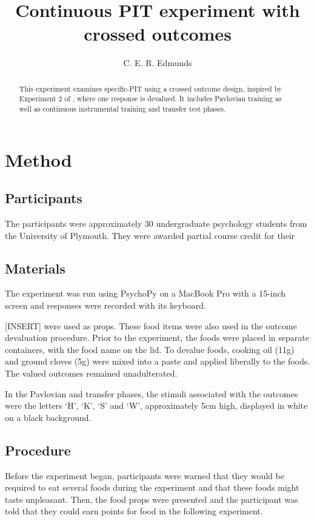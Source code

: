 \documentclass[12pt]{article}
\title{Continuous PIT experiment with crossed outcomes}
\author{C. E. R. Edmunds}
\date{}
\begin{document}
\maketitle
\doublespacing
\newpage
	\begin{abstract}
		This experiment examines specific-PIT using a crossed outcome design,
inspired by Experiment 2 of , where one response is
devalued. It includes Pavlovian training as well as continuous instrumental
training and transfer test phases. 
	\end{abstract}


\section{Method}
\subsection{Participants}

The participants were approximately $30$ undergraduate psychology students from
the University of Plymouth. They were awarded partial course credit for their

\subsection{Materials}
The experiment was run using PsychoPy \cite{Peirce2007, Peirce2009} on a 
MacBook Pro with a 15-inch screen and responses were recorded with
its keyboard.

[INSERT] were used as props. These food items were also used in the outcome
devaluation procedure. Prior to the experiment, the foods were placed in
separate containers, with the food name on the lid. To devalue foods, cooking
oil (11g) and ground cloves (5g) were mixed into a paste and applied liberally
to the foods. The valued outcomes remained unadulterated. 

In the Pavlovian and transfer phases, the stimuli associated with the outcomes
were the letters `H', `K', `S' and `W', approximately 5cm high,
displayed in white on a black background.

\subsection{Procedure}
Before the experiment began, participants were warned that they would be
required to eat several foods during the experiment and that these foods might
taste unpleasant. Then, the food props were presented and the participant was
told that they could earn points for food in the following experiment.
\end{document}
